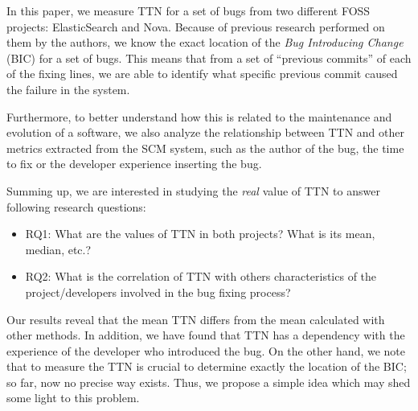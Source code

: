\documentclass[10pt, conference]{IEEEtran}
\begin{document}

In this paper, we measure TTN for a set of bugs from two different FOSS projects: ElasticSearch and Nova. Because of previous research performed on them by the authors, we know the exact location of the \emph{Bug Introducing Change} (BIC) for a set of bugs. This means that from a set of ``previous commits'' of each of the fixing lines, we are able to identify what specific previous commit caused the failure in the system.

Furthermore, to better understand how this is related to the maintenance and evolution of a software, we also analyze the relationship between TTN and other metrics extracted from the SCM system, such as the author of the bug, the time to fix or the developer experience inserting the bug.



Summing up, we are interested in studying the \emph{real} value of TTN to answer following research questions:
\begin{itemize}
  \item RQ1: What are the values of TTN in both projects? What is its mean, median, etc.?
  \item RQ2: What is the correlation of TTN with others characteristics of the project/developers involved in the bug fixing process? 
\end{itemize}

Our results reveal that the mean TTN differs from the mean calculated with other methods. In addition, we have found that TTN has a dependency with the experience of the developer who introduced the bug. On the other hand, we note that to measure the TTN is crucial to determine exactly the location of the BIC; so far, now no precise way exists. Thus, we propose a simple idea which may shed some light to this problem.
\end{document}
